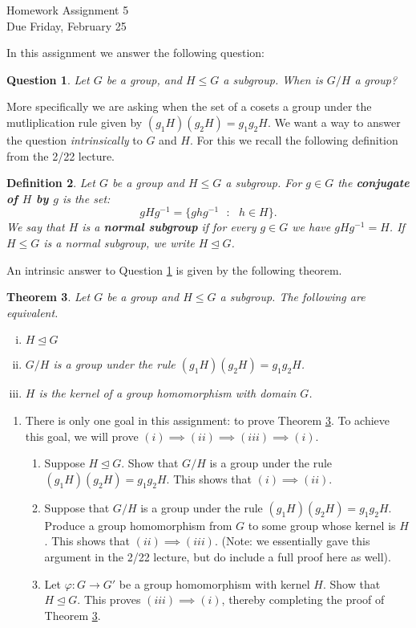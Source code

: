 \documentclass[11pt]{article}
\newtheorem{theorem}{Theorem}
\newtheorem{definition}[theorem]{Definition}
\newtheorem{question}[theorem]{Question}
\begin{document}
\begin{center}
\Large {Homework Assignment 5}\\
\small {Due Friday, February 25}
\end{center}
In this assignment we answer the following question:
\begin{question}\label{q1}
Let $G$ be a group, and $H\le G$ a subgroup.  When is $G/H$ a group?
\end{question}
More specifically we are asking when the set of a cosets a group under the mutliplication rule given by $(g_1H)(g_2H) = g_1g_2H$.  We want a way to answer the question \textit{intrinsically} to $G$ and $H$.  For this we recall the following definition from the 2/22 lecture.
\begin{definition}
Let $G$ be a group and $H\le G$ a subgroup.  For $g\in G$ the \textbf{conjugate of $H$ by $g$} is the set:
\[gHg^{-1} = \{ghg^{-1}\text{ }:\text{ }h\in H\}.\]
We say that $H$ is a \textbf{normal subgroup} if for every $g\in G$ we have
$gHg^{-1} = H$.  If $H\le G$ is a normal subgroup, we write $H\unlhd G$.
\end{definition}
An intrinsic answer to Question \ref{q1} is given by the following theorem.
\begin{theorem}\label{t1}
Let $G$ be a group and $H\le G$ a subgroup.  The following are equivalent.
\begin{enumerate}[(i)]
\item $H\unlhd G$
\item $G/H$ is a group under the rule $(g_1H)(g_2H) = g_1g_2H$.
\item $H$ is the kernel of a group homomorphism with domain $G$.
\end{enumerate}
\end{theorem}
\begin{enumerate}
\item{There is only one goal in this assignment: to prove Theorem \ref{t1}.  To achieve this goal, we will prove $(i)\implies(ii)\implies(iii)\implies(i)$.
\begin{enumerate}
\item{Suppose $H\unlhd G$.  Show that $G/H$ is a group under the rule $(g_1H)(g_2H) = g_1g_2H$.  This shows that $(i)\implies(ii)$.}
\item{Suppose that $G/H$ is a group under the rule $(g_1H)(g_2H) = g_1g_2H$.  Produce a group homomorphism from $G$ to some group whose kernel is $H$.  This shows that $(ii)\implies (iii)$.  (Note: we essentially gave this argument in the 2/22 lecture, but do include a full proof here as well).}
\item{Let $\varphi:G\to G'$ be a group homomorphism with kernel $H$.  Show that $H\unlhd G$.  This proves $(iii)\implies(i)$, thereby completing the proof of Theorem \ref{t1}.}
\end{enumerate}
}
\end{enumerate}
\end{document}
